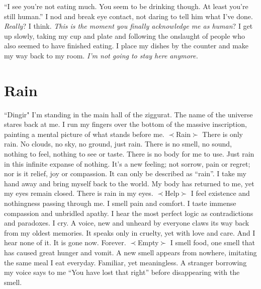 \documentclass[openany, 12pt]{book}
\newcommand\tab[1][1cm]{\hspace*{#1}}
\begin{document}
\newline
\tab
``I see you’re not eating much. You seem to be drinking though. At least you’re still human.''
\newline
\tab
I nod and break eye contact, not daring to tell him what I’ve done. 
\newline
\tab
\textit{Really}? I think. \textit{This is the moment you finally acknowledge me as human}? I get up slowly, taking my cup and plate and following the onslaught of people who also seemed to have finished eating. I place my dishes by the counter and make my way back to my room.
\newline
\tab
\textit{I’m not going to stay here anymore.}
\chapter{Rain}
“Dingir"\newline
\tab
I’m standing in the main hall of the ziggurat. The name of the universe stares back at me. I run my fingers over the bottom of the massive inscription, painting a mental picture of what stands before me.\newline
$\prec$Rain$\succ$\newline
\tab
There is only rain. No clouds, no sky, no ground, just rain. There is no smell, no sound, nothing to feel, nothing to see or taste. There is no body for me to use. Just rain in this infinite expanse of nothing. It's a new feeling; not sorrow, pain or regret; nor is it relief, joy or compassion. It can only be described as ``rain''. I take my hand away and bring myself back to the world. My body has returned to me, yet my eyes remain closed. There is rain in my eyes.  \newline
$\prec$Help$\succ$\newline
\tab
I feel existence and nothingness passing through me. I smell pain and comfort. I taste immense compassion and unbridled apathy. I hear the most perfect logic as contradictions and paradoxes. I cry. A voice, new and unheard by everyone claws its way back from my oldest memories. It speaks only in cruelty, yet with love and care. And I hear none of it.\newline
\tab
It is gone now. Forever. \newline
$\prec$Empty$\succ$\newline
\tab
I smell food, one smell that has caused great hunger and vomit. A new smell appears from nowhere, imitating the same meal I eat everyday. Familiar, yet meaningless. A stranger borrowing my voice says to me “You have lost that right” before disappearing with the smell.\newline
\end{document}

